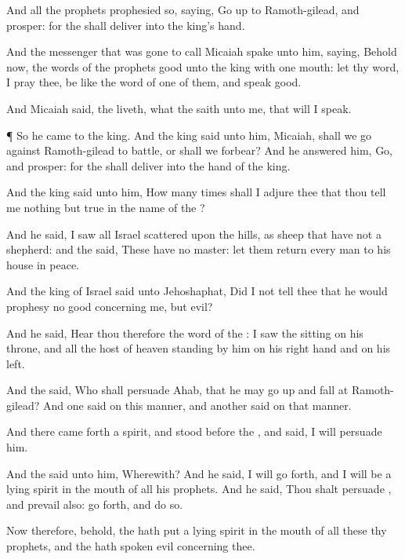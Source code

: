 {And all the
prophets
prophesied so,
saying, Go
up to
Ramoth-gilead, and
prosper: for the
{} shall
deliver
{} into the
king’s
hand.

And the
messenger that was
gone to
call
Micaiah
spake unto him,
saying, Behold now, the
words of the
prophets
{}
good unto the
king with
one
mouth: let thy
word, I pray thee, be like the
word of
one of them, and
speak
{}
good.

And
Micaiah
said,
{} the
{}
liveth, what the
{}
saith unto me, that will I
speak.


\par }{\PP {}¶ So he
came to the
king. And the
king
said unto him,
Micaiah, shall we
go against
Ramoth-gilead to
battle, or shall we
forbear? And he
answered him,
Go, and
prosper: for the
{} shall
deliver
{} into the
hand of the
king.

And the
king
said unto him, How many
times shall I
adjure thee that thou
tell me nothing but
{}
true in the
name of the
{}?

And he
said, I
saw all
Israel
scattered upon the
hills, as
sheep that have not a
shepherd: and the
{}
said, These have no
master: let them
return every
man to his
house in
peace.

And the
king of
Israel
said unto
Jehoshaphat, Did I not
tell thee that he would
prophesy no
good concerning me, but
evil?

And he
said,
Hear thou therefore the
word of the
{}: I
saw the
{}
sitting on his
throne, and all the
host of
heaven
standing by him on his right
hand and on his
left.

And the
{}
said, Who shall
persuade
Ahab, that he may go
up and
fall at
Ramoth-gilead? And one
said on this
manner, and another
said on that
manner.

And there came
forth a
spirit, and
stood
before the
{}, and
said, I will
persuade him.

And the
{}
said unto him, Wherewith? And he
said, I will go
forth, and I will be a
lying
spirit in the
mouth of all his
prophets. And he
said, Thou shalt
persuade
{}, and
prevail also: go
forth, and
do so.

Now therefore, behold, the
{} hath
put a
lying
spirit in the
mouth of all these thy
prophets, and the
{} hath
spoken
evil concerning thee.

}
